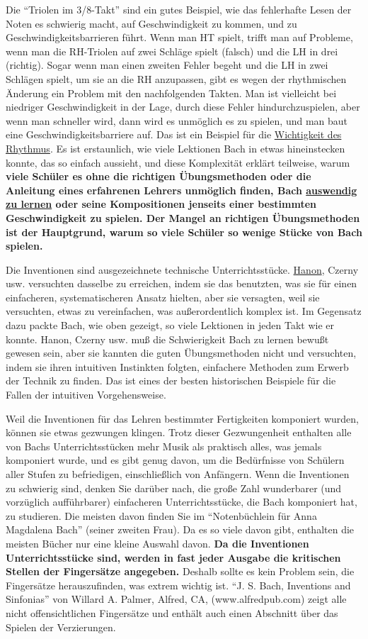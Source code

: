 Die \enquote{Triolen im 3/8-Takt} sind ein gutes Beispiel, wie das fehlerhafte Lesen der Noten es schwierig macht, auf Geschwindigkeit zu kommen, und zu Geschwindigkeitsbarrieren führt.
Wenn man HT spielt, trifft man auf Probleme, wenn man die RH-Triolen auf zwei Schläge spielt (falsch) und die LH in drei (richtig).
Sogar wenn man einen zweiten Fehler begeht und die LH in zwei Schlägen spielt, um sie an die RH anzupassen, gibt es wegen der rhythmischen Änderung ein Problem mit den nachfolgenden Takten.
Man ist vielleicht bei niedriger Geschwindigkeit in der Lage, durch diese Fehler hindurchzuspielen, aber wenn man schneller wird, dann wird es unmöglich es zu spielen, und man baut eine Geschwindigkeitsbarriere auf.
Das ist ein Beispiel für die \hyperref[c1iii1b]{Wichtigkeit des Rhythmus}.
Es ist erstaunlich, wie viele Lektionen Bach in etwas hineinstecken konnte, das so einfach aussieht, und diese Komplexität erklärt teilweise, warum \textbf{viele Schüler es ohne die richtigen Übungsmethoden oder die Anleitung eines erfahrenen Lehrers unmöglich finden, Bach \hyperref[c1iii6]{auswendig zu lernen} oder seine Kompositionen jenseits einer bestimmten Geschwindigkeit zu spielen.
Der Mangel an richtigen Übungsmethoden ist der Hauptgrund, warum so viele Schüler so wenige Stücke von Bach spielen.}

Die Inventionen sind ausgezeichnete technische Unterrichtsstücke.
\hyperref[c1iii7h]{Hanon}, Czerny usw. versuchten dasselbe zu erreichen, indem sie das benutzten, was sie für einen einfacheren, systematischeren Ansatz hielten, aber sie versagten, weil sie versuchten, etwas zu vereinfachen, was außerordentlich komplex ist.
Im Gegensatz dazu packte Bach, wie oben gezeigt, so viele Lektionen in jeden Takt wie er konnte.
Hanon, Czerny usw. muß die Schwierigkeit Bach zu lernen bewußt gewesen sein, aber sie kannten die guten Übungsmethoden nicht und versuchten, indem sie ihren intuitiven Instinkten folgten, einfachere Methoden zum Erwerb der Technik zu finden.
Das ist eines der besten historischen Beispiele für die Fallen der intuitiven Vorgehensweise.

Weil die Inventionen für das Lehren bestimmter Fertigkeiten komponiert wurden, können sie etwas gezwungen klingen. 
Trotz dieser Gezwungenheit enthalten alle von Bachs Unterrichtsstücken mehr Musik als praktisch alles, was jemals komponiert wurde, und es gibt genug davon, um die Bedürfnisse von Schülern aller Stufen zu befriedigen, einschließlich von Anfängern.
Wenn die Inventionen zu schwierig sind, denken Sie darüber nach, die große Zahl wunderbarer (und vorzüglich aufführbarer) einfacheren Unterrichtsstücke, die Bach komponiert hat, zu studieren.
Die meisten davon finden Sie im \enquote{Notenbüchlein für Anna Magdalena Bach} (seiner zweiten Frau).
Da es so viele davon gibt, enthalten die meisten Bücher nur eine kleine Auswahl davon.
\textbf{Da die Inventionen Unterrichtsstücke sind, werden in fast jeder Ausgabe die kritischen Stellen der Fingersätze angegeben.}
Deshalb sollte es kein Problem sein, die Fingersätze herauszufinden, was extrem wichtig ist.
\enquote{J. S. Bach, Inventions and Sinfonias} von Willard A. Palmer, Alfred, CA, (www.alfredpub.com) zeigt alle nicht offensichtlichen Fingersätze und enthält auch einen Abschnitt über das Spielen der Verzierungen.

